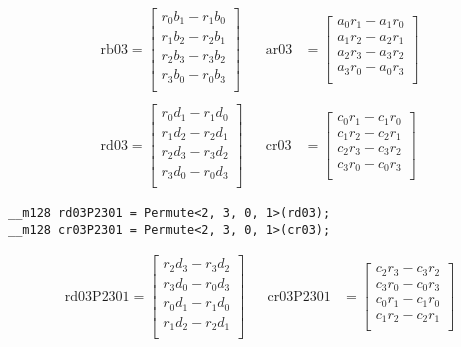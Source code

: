 \begin{align*}
\mathrm{rb03} 
=
\begin{bmatrix}
r_0b_1 - r_1b_0\\
r_1b_2 - r_2b_1\\
r_2b_3 - r_3b_2\\
r_3b_0 - r_0b_3\\
\end{bmatrix}
&&
\mathrm{ar03} 
&=
\begin{bmatrix}
a_0r_1 - a_1r_0\\
a_1r_2 - a_2r_1\\
a_2r_3 - a_3r_2\\
a_3r_0 - a_0r_3\\
\end{bmatrix}
\\
\\
\mathrm{rd03} 
=
\begin{bmatrix}
r_0d_1 - r_1d_0\\
r_1d_2 - r_2d_1\\
r_2d_3 - r_3d_2\\
r_3d_0 - r_0d_3\\
\end{bmatrix}
&&
\mathrm{cr03} 
&=
\begin{bmatrix}
c_0r_1 - c_1r_0\\
c_1r_2 - c_2r_1\\
c_2r_3 - c_3r_2\\
c_3r_0 - c_0r_3\\
\end{bmatrix}
\end{align*}

\begin{verbatim}
__m128 rd03P2301 = Permute<2, 3, 0, 1>(rd03);
__m128 cr03P2301 = Permute<2, 3, 0, 1>(cr03);
\end{verbatim}

\begin{align*}
\mathrm{rd03P2301} 
=
\begin{bmatrix}
r_2d_3 - r_3d_2\\
r_3d_0 - r_0d_3\\
r_0d_1 - r_1d_0\\
r_1d_2 - r_2d_1\\
\end{bmatrix}
&&
\mathrm{cr03P2301} 
&=
\begin{bmatrix}
c_2r_3 - c_3r_2\\
c_3r_0 - c_0r_3\\
c_0r_1 - c_1r_0\\
c_1r_2 - c_2r_1\\
\end{bmatrix}
\end{align*}

